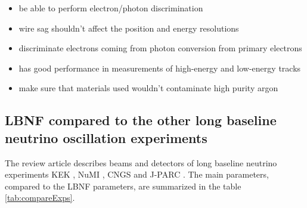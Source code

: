 \begin{itemize}
  \item be able to perform electron/photon discrimination
  \item wire sag shouldn't affect the position and energy resolutions
  \item discriminate electrons coming from photon conversion from primary electrons
  \item has good performance in measurements of high-energy and low-energy tracks
  \item make sure that materials used wouldn't contaminate high purity argon
\end{itemize}



\subsection{LBNF compared to the other long baseline neutrino oscillation experiments}
The review article \cite{ref_LBN_OscExpReview} describes beams and detectors of long baseline neutrino experiments KEK \cite{ref_KEK}, NuMI \cite{ref_NuMI}, CNGS \cite{ref_CNGS} and J-PARC \cite{ref_JPARC}. The main parameters, compared to the LBNF parameters, are summarized in the table \ref{tab:compareExps}.

